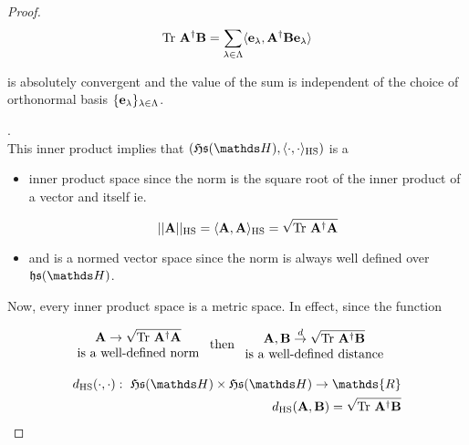 \documentclass{homework}
\begin{document}
\begin{proof}
{$$
\textnormal{Tr } {\bf A^\dagger}{\bf B} = \sum_{\lambda \in \Lambda} \langle {\bf e}_{\lambda}, {\bf A}^\dagger {\bf B} {\bf e}_{\lambda} \rangle 
$$

is absolutely convergent and the value of the sum is independent of the choice of orthonormal basis $\{{\bf e}_{\lambda}\}_{\lambda \in \Lambda}$. 
}. \\

This inner product implies that $(\mathfrak{H}\mathfrak{s}(\hilbert), \langle \cdot , \cdot \rangle_{\textnormal{HS}})$ is a

\begin{itemize}
    \item inner product space since the norm is the square root of the inner product of a vector and itself ie.
    
    $$
    ||{\bf A}||_{\textnormal{HS}} = \langle {\bf A} , {\bf A} \rangle_{\textnormal{HS}} = \sqrt{\textnormal{Tr } \bf A^\dagger {\bf A}}
    $$
    
    \item and is a normed vector space since the norm is always well defined over $\mathfrak{h}\mathfrak{s}(\hilbert)$. 
\end{itemize}

Now, every inner product space is a metric space. In effect, since the function 

\begin{align*}
    \begin{array}{c}
         {\bf A} \rightarrow \sqrt{\textnormal{Tr } {\bf A^\dagger}{\bf A}}  \\
         \textnormal{is a well-defined norm}  
    \end{array} & \textnormal{ then }  \begin{array}{c}
         {\bf A}, {\bf B} \overset{d}{\rightarrow} \sqrt{\textnormal{Tr } {\bf A}^{\dagger} {\bf B}}  \\
         \textnormal{is a well-defined distance}
    \end{array}
\end{align*}

\begin{equation*}
\begin{split}
   d_{\textnormal{HS}}(\cdot, \cdot): \blanky \mathfrak{H}\mathfrak{s}(\hilbert) \times \mathfrak{H}\mathfrak{s}(\hilbert) \rightarrow \mathds{R} \\
   d_{\textnormal{HS}}({\bf A}, {\bf B}) = \sqrt{\textnormal{Tr } {\bf A}^\dagger {\bf B}}
\end{split}
\end{equation*}


\end{proof}
\end{document}
